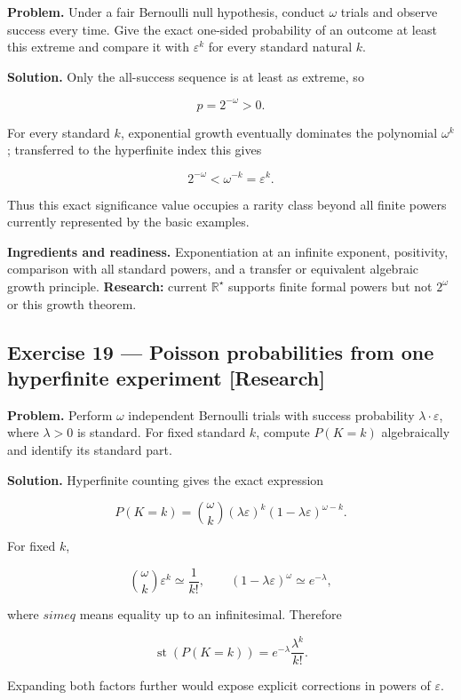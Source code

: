 \documentclass[11pt]{article}
\newcommand{\Rstar}{\mathbb{R}^{\star}}
\newcommand{\eps}{\varepsilon}
\renewcommand{\epsilon}{\varepsilon}
\begin{document}
\textbf{Problem.} Under a fair Bernoulli null hypothesis, conduct $\omega$ trials
and observe success every time. Give the exact one-sided probability of an
outcome at least this extreme and compare it with $\eps^k$ for every
standard natural $k$.

\textbf{Solution.} Only the all-success sequence is at least as extreme, so

\[
p=2^{-\omega}>0.
\]

For every standard $k$, exponential growth eventually dominates the
polynomial $\omega^k$; transferred to the hyperfinite index this gives

\[
2^{-\omega}<\omega^{-k}=\epsilon^k.
\]

Thus this exact significance value occupies a rarity class beyond all finite
powers currently represented by the basic examples.

\textbf{Ingredients and readiness.} Exponentiation at an infinite exponent,
positivity, comparison with all standard powers, and a transfer or equivalent
algebraic growth principle. \textbf{Research:} current $\Rstar$ supports finite formal
powers but not $2^\omega$ or this growth theorem.


\subsection*{Exercise 19 --- Poisson probabilities from one hyperfinite experiment \hfill \normalfont\small[Research]}

\textbf{Problem.} Perform $\omega$ independent Bernoulli trials with success
probability $\lambda\cdot \eps$, where $\lambda>0$ is standard. For fixed standard
$k$, compute $P(K=k)$ algebraically and identify its standard part.

\textbf{Solution.} Hyperfinite counting gives the exact expression

\[
P(K=k)={\omega\choose k}(\lambda\epsilon)^k
       (1-\lambda\epsilon)^{\omega-k}.
\]

For fixed $k$,

\[
{\omega\choose k}\epsilon^k\simeq\frac1{k!},
\qquad
(1-\lambda\epsilon)^\omega\simeq e^{-\lambda},
\]

where $simeq$ means equality up to an infinitesimal. Therefore

\[
\operatorname{st}(P(K=k))=e^{-\lambda}\frac{\lambda^k}{k!}.
\]

Expanding both factors further would expose explicit corrections in powers of
$\eps$.
\end{document}
